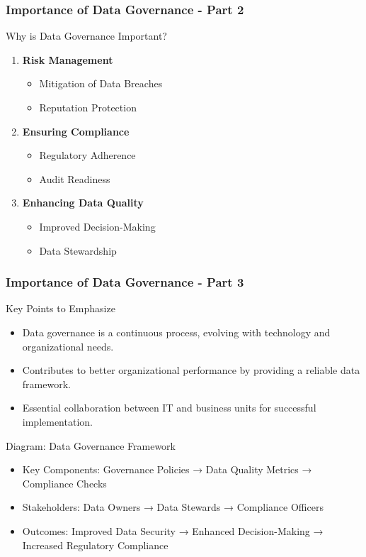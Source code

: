 \documentclass[aspectratio=169]{beamer}
\begin{document}
\begin{frame}[fragile]
    \frametitle{Importance of Data Governance - Part 2}
    \begin{block}{Why is Data Governance Important?}
        \begin{enumerate}
            \item \textbf{Risk Management}
                \begin{itemize}
                    \item Mitigation of Data Breaches
                    \item Reputation Protection
                \end{itemize}
            \item \textbf{Ensuring Compliance}
                \begin{itemize}
                    \item Regulatory Adherence
                    \item Audit Readiness
                \end{itemize}
            \item \textbf{Enhancing Data Quality}
                \begin{itemize}
                    \item Improved Decision-Making
                    \item Data Stewardship
                \end{itemize}
        \end{enumerate}
    \end{block}
\end{frame}

\begin{frame}[fragile]
    \frametitle{Importance of Data Governance - Part 3}
    \begin{block}{Key Points to Emphasize}
        \begin{itemize}
            \item Data governance is a continuous process, evolving with technology and organizational needs.
            \item Contributes to better organizational performance by providing a reliable data framework.
            \item Essential collaboration between IT and business units for successful implementation.
        \end{itemize}
    \end{block}
    
    \begin{block}{Diagram: Data Governance Framework}
        \begin{itemize}
            \item Key Components: Governance Policies → Data Quality Metrics → Compliance Checks
            \item Stakeholders: Data Owners → Data Stewards → Compliance Officers
            \item Outcomes: Improved Data Security → Enhanced Decision-Making → Increased Regulatory Compliance
        \end{itemize}
    \end{block}
\end{frame}
\end{document}

